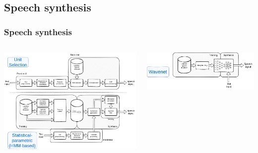 \documentclass[a4paper,9pt]{beamer}
\theoremstyle{mytheoremstyle}
\begin{document}
\subsection{Speech synthesis}
\begin{frame}
\frametitle{Speech synthesis}
\begin{columns}
\begin{column}{0.6\textwidth}
\includegraphics[width=\textwidth]{res/speech_synthesis_clunit_hmm.png}
\end{column}
\vrule{}
\vspace{2cm}
\includegraphics[width=\textwidth]{res/speech_synthesis_wavenet.png}\\
\end{columns}
\end{frame}
\end{document}
